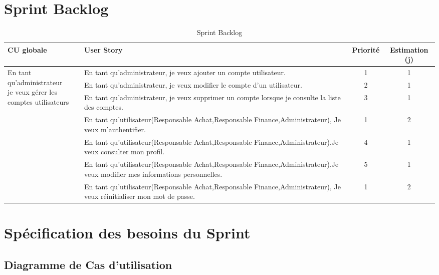 \documentclass[a4paper,11pt]{report}
\begin{document}
\section{Sprint Backlog}
\begin{table}[htbp]
  \centering
  \caption{Sprint Backlog}
  \label{tab:sprint-backlog}
  \begin{tabular}{|p{3cm}|p{8cm}|c|c|}
    \hline
    \textbf{CU globale} 
      & \textbf{User Story} 
      & \textbf{Priorité} 
      & \textbf{Estimation (j)} \\ 
    \hline
    \multirow{3}{=}{\parbox{3cm}{En tant qu’administrateur\\je veux gérer les\\comptes utilisateurs}}
      & En tant qu’administrateur, je veux ajouter un compte utilisateur. 
      & 1 & 1 \\ \cline{2-4}
    & En tant qu’administrateur, je veux modifier le compte d’un utilisateur. 
      & 2 & 1 \\ \cline{2-4}
    & En tant qu’administrateur, je veux supprimer un compte lorsque je consulte la liste des comptes. 
      & 3 & 1 \\ 
    \hline
    \multirow{4}{=}{\parbox{3cm}{}}
      & En tant qu’utilisateur(Responsable Achat,Responsable Finance,Administrateur), Je veux m’authentifier. 
      & 1 & 2 \\ \cline{2-4}
    & En tant qu’utilisateur(Responsable Achat,Responsable Finance,Administrateur),Je veux consulter mon profil. 
      & 4 & 1 \\ \cline{2-4}
    & En tant qu’utilisateur(Responsable Achat,Responsable Finance,Administrateur),Je veux modifier mes informations personnelles. 
      & 5 & 1 \\ \cline{2-4}
    & En tant qu’utilisateur(Responsable Achat,Responsable Finance,Administrateur), Je veux réinitialiser mon mot de passe. 
      & 1 & 2 \\
    \hline
  \end{tabular}
\end{table}

\section{Spécification des besoins du Sprint}

\subsection{Diagramme de Cas d'utilisation}
\end{document}
